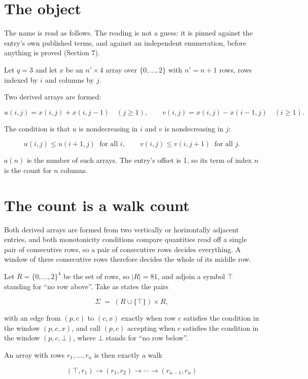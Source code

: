 \documentclass[11pt]{article}
\theoremstyle{definition}
\begin{document}
\section{The object}

The name is read as follows. The reading is not a guess: it is pinned against the entry's own published terms, and against an independent enumeration, before anything is proved (Section 7).

Let $q = 3$ and let $x$ be an $n' \times 4$ array over $\{0,\dots,2\}$ with $n' = n + 1$ rows, rows indexed by $i$ and columns by $j$.

Two derived arrays are formed:

\[u(i,j) = x(i,j) + x(i,j{-}1)\quad (j \ge 1), \qquad v(i,j) = x(i,j) - x(i{-}1,j)\quad (i \ge 1).\]

The condition is that $u$ is nondecreasing in $i$ and $v$ is nondecreasing in $j$:

\[u(i,j) \le u(i{+}1,j) \ \text{ for all } i, \qquad v(i,j) \le v(i,j{+}1) \ \text{ for all } j.\]

$a(n)$ is the number of such arrays. The entry's offset is 1, so its term of index $n$ is the count for $n$ columns.

\section{The count is a walk count}

Both derived arrays are formed from two vertically or horizontally adjacent entries, and both monotonicity conditions compare quantities read off a single pair of consecutive rows, so a pair of consecutive rows decides everything. A window of three consecutive rows therefore decides the whole of its middle row.

Let $R = \{0,\dots,2\}^{4}$ be the set of rows, so $|R| = 81$, and adjoin a symbol $\top$ standing for ``no row above''. Take as states the pairs

\[\Sigma \;=\; (R \cup \{\top\}) \times R,\]

with an edge from $(p,c)$ to $(c,x)$ exactly when row $c$ satisfies the condition in the window $(p,c,x)$, and call $(p,c)$ accepting when $c$ satisfies the condition in the window $(p,c,\bot)$, where $\bot$ stands for ``no row below''.

An array with rows $r_1,\dots,r_n$ is then exactly a walk

\[(\top,r_1) \to (r_1,r_2) \to \cdots \to (r_{n-1},r_n)\]
\end{document}
